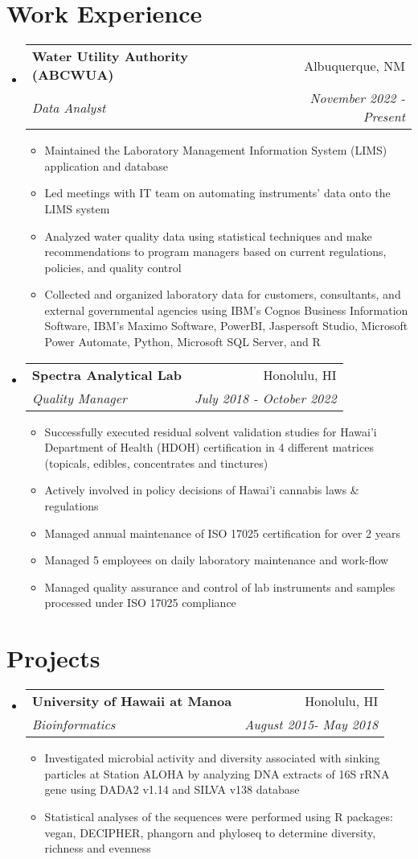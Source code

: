 \documentclass[letterpaper,11pt]{article}
\makeatletter
\newcommand{\resitem}[1]{\item #1 \vspace{-2pt}}
\newcommand{\ressubheading}[4]{
\begin{tabular*}{6.5in}{l@{\extracolsep{\fill}}r}
		\textbf{#1} & #2 \\
		\textit{#3} & \textit{#4} \\
\end{tabular*}\vspace{-6pt}}
\makeatother
\begin{document}
\section{Work Experience}
\begin{itemize}
\item
    \ressubheading{Water Utility Authority (ABCWUA)}{Albuquerque, NM}{Data Analyst}{November 2022 - Present}
    \begin{itemize}
        \resitem{Maintained the Laboratory Management Information System (LIMS) application and database}
        \resitem{Led meetings with IT team on automating instruments' data onto the LIMS system}
        \resitem{Analyzed water quality data using statistical techniques and make recommendations to program managers based on current regulations, policies, and quality control}
        \resitem{Collected and organized laboratory data for customers, consultants, and external governmental agencies using IBM’s Cognos Business Information Software, IBM's Maximo Software, PowerBI, Jaspersoft Studio, Microsoft Power Automate, Python, Microsoft SQL Server, and R}
   \end{itemize}
\item
	\ressubheading{Spectra Analytical Lab}{Honolulu, HI}{Quality Manager}{July 2018 - October 2022}
	\begin{itemize}
		\resitem{Successfully executed residual solvent validation studies for Hawai'i Department of Health (HDOH) certification in 4 different matrices (topicals, edibles, concentrates and tinctures)}
		\resitem{Actively involved in policy decisions of Hawai'i cannabis laws \& regulations}
		\resitem{Managed annual maintenance of ISO 17025 certification for over 2 years}
	    \resitem{Managed 5 employees on daily laboratory maintenance and work-flow}
		\resitem{Managed quality assurance and control of lab instruments and samples processed under ISO 17025 compliance}
	\end{itemize}
\end{itemize}

\section{Projects}
\begin{itemize}
\item
    \ressubheading{University of Hawaii at Manoa}{Honolulu, HI}{Bioinformatics}{August 2015- May 2018}
    \begin{itemize}
        \resitem{Investigated microbial activity and diversity associated with sinking particles at Station ALOHA by analyzing DNA extracts of 16S rRNA gene using DADA2 v1.14 and SILVA v138 database}
        \resitem{Statistical analyses of the sequences were performed using R packages: vegan, DECIPHER, phangorn and phyloseq to determine diversity, richness and evenness}
    \end{itemize}
\end{itemize}
\end{document}

